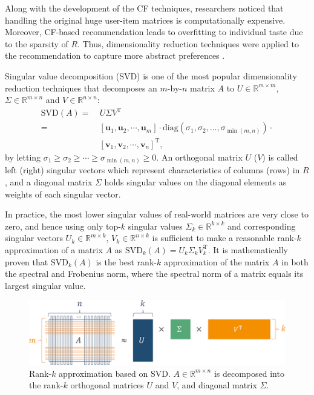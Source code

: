 Along with the development of the CF techniques, researchers noticed that handling the original huge user-item matrices is computationally expensive. Moreover, CF-based recommendation leads to overfitting to individual taste due to the sparsity of $R$. Thus, dimensionality reduction techniques were applied to the recommendation to capture more abstract preferences \cite{Sarwar2000}.

Singular value decomposition (SVD) is one of the most popular dimensionality reduction techniques that decomposes an $m$-by-$n$ matrix $A$ to $U \in \mathbb{R}^{m \times m}$, $\Sigma \in \mathbb{R}^{m \times n}$ and $V \in \mathbb{R}^{n \times n}$: 
\begin{align*}
\mathrm{SVD}(A) =& \ U \Sigma V^{\mathrm{T}} \\ 
= & \ \left[\mathbf{u}_1, \mathbf{u}_2, \cdots, \mathbf{u}_m\right] \cdot \mathrm{diag}\left(\sigma_1, \sigma_2, \dots, \sigma_{\min(m, n)}\right) \cdot \\
& \ \left[\mathbf{v}_1, \mathbf{v}_2, \cdots, \mathbf{v}_n\right]^{\mathrm{T}},
\end{align*}
by letting $\sigma_1 \geq \sigma_2 \geq \cdots \geq \sigma_{\min(m, n)} \geq 0$. An orthogonal matrix $U$ ($V$) is called left (right) singular vectors which represent characteristics of columns (rows) in $R$, and a diagonal matrix $\Sigma$ holds singular values on the diagonal elements as weights of each singular vector.

In practice, the most lower singular values of real-world matrices are very close to zero, and hence using only top-$k$ singular values $\Sigma_k \in \mathbb{R}^{k \times k}$ and corresponding singular vectors $U_k \in \mathbb{R}^{m \times k}$, $V_k \in \mathbb{R}^{n \times k}$ is sufficient to make a reasonable rank-$k$ approximation of a matrix $A$ as $\mathrm{SVD}_k(A) = U_k \Sigma_k V_k^{\mathrm{T}}$. It is mathematically proven that $\mathrm{SVD}_k(A)$ is the best rank-$k$ approximation of the matrix $A$ in both the spectral and Frobenius norm, where the spectral norm of a matrix equals its largest singular value.

\begin{figure}[htbp]
  \centering
  \includegraphics[width=1.0\linewidth]{images/svd.pdf}
  \caption{Rank-$k$ approximation based on SVD. $A \in \mathbb{R}^{m \times n}$ is decomposed into the rank-$k$ orthogonal matrices $U$ and $V$, and diagonal matrix $\Sigma$.}
  \label{fig:svd}
\end{figure}

